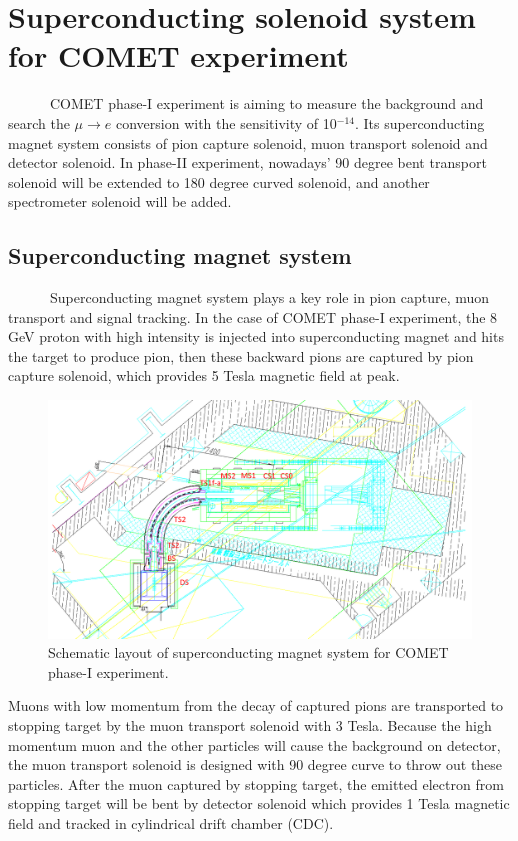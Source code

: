 \chapter{Superconducting solenoid system for COMET experiment}
~~~~~~COMET phase-I experiment is aiming to measure the background and search the $\mu \rightarrow e$ conversion with the sensitivity of 10$^{-14}$.
Its superconducting magnet system consists of pion capture solenoid, muon transport solenoid and detector solenoid.
In phase-II experiment, nowadays' 90 degree bent transport solenoid will be extended to 180 degree curved solenoid, and another spectrometer solenoid will be added.
 
\section{Superconducting magnet system}
~~~~~~Superconducting magnet system plays a key role in pion capture, muon transport and signal tracking.
In the case of COMET phase-I experiment, the 8 GeV proton with high intensity is injected into superconducting magnet and hits the target to produce pion, then these backward pions are captured by pion capture solenoid, which provides 5 Tesla magnetic field at peak.
\begin{figure}[H]
 \centering
 \includegraphics[scale=0.45]{chapter2/fig/solenoid.pdf}
 \caption{Schematic layout of superconducting magnet system for COMET phase-I experiment.}
 \label{solenoid}
\end{figure}
Muons with low momentum from the decay of captured pions are transported to stopping target by the muon transport solenoid with 3 Tesla.
Because the high momentum muon and the other particles will cause the background on detector, the muon transport solenoid is designed with 90 degree curve to throw out these particles.
After the muon captured by stopping target, the emitted electron from stopping target will be bent by detector solenoid which provides 1 Tesla magnetic field and tracked in cylindrical drift chamber (CDC).

